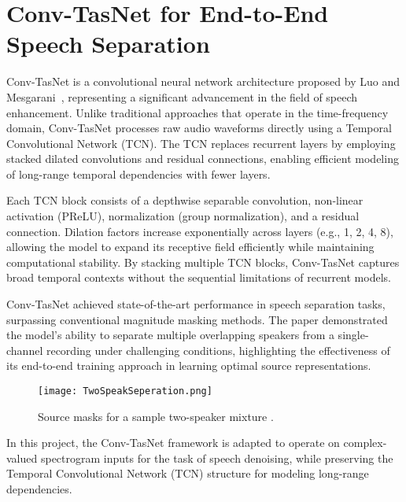 \section{Conv-TasNet for End-to-End Speech Separation}
\label{sec:convtasnet_lit_review}

Conv-TasNet is a convolutional neural network architecture proposed by Luo and Mesgarani~\cite{luo2019conv}, representing a significant advancement in the field of speech enhancement. Unlike traditional approaches that operate in the time-frequency domain, Conv-TasNet processes raw audio waveforms directly using a Temporal Convolutional Network (TCN). The TCN replaces recurrent layers by employing stacked dilated convolutions and residual connections, enabling efficient modeling of long-range temporal dependencies with fewer layers.

Each TCN block consists of a depthwise separable convolution, non-linear activation (PReLU), normalization (group normalization), and a residual connection. Dilation factors increase exponentially across layers (e.g., 1, 2, 4, 8), allowing the model to expand its receptive field efficiently while maintaining computational stability. By stacking multiple TCN blocks, Conv-TasNet captures broad temporal contexts without the sequential limitations of recurrent models.

Conv-TasNet achieved state-of-the-art performance in speech separation tasks, surpassing conventional magnitude masking methods. The paper demonstrated the model's ability to separate multiple overlapping speakers from a single-channel recording under challenging conditions, highlighting the effectiveness of its end-to-end training approach in learning optimal source representations.

\begin{figure}[H]
    \centering
    \texttt{[image: TwoSpeakSeperation.png]}
    \caption{Source masks for a sample two-speaker mixture \cite{luo2019conv}.}
    \label{fig:convtasnet}
\end{figure}

In this project, the Conv-TasNet framework is adapted to operate on complex-valued spectrogram inputs for the task of speech denoising, while preserving the Temporal Convolutional Network (TCN) structure for modeling long-range dependencies.
